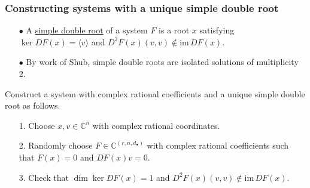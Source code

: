 \documentclass{beamer}
\theoremstyle{definition}
\newcommand{\blue}[1]{{\color{black!10!blue}\underline{#1}}}
\begin{document}
\begin{frame}
\frametitle{Constructing systems with a unique simple double root}
\hspace{-.3cm}
\begin{minipage}{.98\textwidth}
\begin{enumerate}
\item[$\bullet$] A \blue{simple double root} of a system $F$ is a root $x$ satisfying $\ker DF(x) = \langle v \rangle$ and $D^2F(x)(v,v)\not\in \text{im}\,DF(x)$. 

\item[$\bullet$] By work of Shub, simple double roots are isolated solutions of multiplicity 2.
\end{enumerate}
\end{minipage}

Construct a system with complex rational coefficients and a unique simple double root as follows.
\vspace{-.15cm}
\begin{enumerate}
\item[1.] Choose $x,v\in\mathbb{C}^n$ with complex rational coordinates.

\item[2.] Randomly choose $F\in\mathbb{C}^{(r,n,d_\bullet)}$ with complex rational coefficients such that $F(x)=0$ and $DF(x)v=0$.

\item[3.] Check that $\dim \ker DF(x) = 1$ and $D^2F(x)(v,v)\not\in\text{im}\,DF(x)$.

\end{enumerate}
\end{frame}


\end{document}
